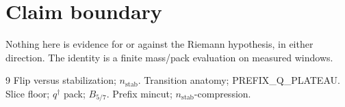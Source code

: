 \documentclass[11pt]{article}
\begin{document}
\section*{Claim boundary}

Nothing here is evidence for or against the
Riemann hypothesis, in either direction.
The identity is a finite mass/pack
evaluation on measured windows.

\begin{thebibliography}{9}
 Flip versus stabilization; $n_{\mathrm{stab}}$.
 Transition anatomy; PREFIX\_Q\_PLATEAU.
 Slice floor; $q^{\dagger}$ pack; $B_{5/7}$.
 Prefix mincut; $n_{\mathrm{stab}}$-compression.
\end{thebibliography}
\end{document}
